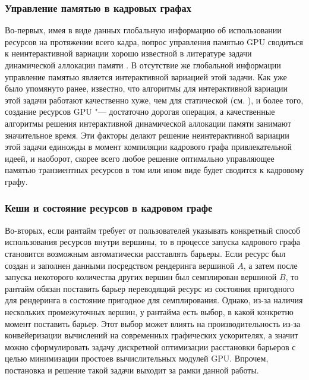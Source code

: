 \subsubsection{Управление памятью в кадровых графах}
Во-первых, имея в виде данных глобальную информацию об использовании ресурсов на протяжении всего кадра, вопрос управления памятью GPU сводиться к неинтерактивной вариации хорошо известной в литературе задачи динамической аллокации памяти \cite[с. 226]{10.5555/574848}.
В отсутствие же глобальной информации управление памятью является интерактивной вариацией этой задачи.
Как уже было упомянуто ранее, известно, что алгоритмы для интерактивной вариации этой задачи работают качественно хуже, чем для статической (см. \cite{robson1971estimate}), и более того, создание ресурсов GPU "--- достаточно дорогая операция, а качественные алгоритмы решения интерактивной динамической аллокации памяти занимают значительное время.
Эти факторы делают решение неинтерактивной вариации этой задачи единожды в момент компиляции кадрового графа привлекательной идеей, и наоборот, скорее всего любое решение оптимально управляющее памятью транзиентных ресурсов в том или ином виде будет сводится к кадровому графу.

\subsubsection{Кеши и состояние ресурсов в кадровом графе}
Во-вторых, если рантайм требует от пользователей указывать конкретный способ использования ресурсов внутри вершины, то в процессе запуска кадрового графа становится возможным автоматически расставлять барьеры.
Если ресурс был создан и заполнен данными посредством рендеринга вершиной $A$, а затем после запуска некоторого количества других вершин был семплирован вершиной $B$, то рантайм обязан поставить барьер переводящий ресурс из состояния пригодного для рендеринга в состояние пригодное для семплирования.
Однако, из-за наличия нескольких промежуточных вершин, у рантайма есть выбор, в какой конкретно момент поставить барьер.
Этот выбор может влиять на производительность из-за конвейеризации вычислений на современных графических ускорителях, а значит можно сформулировать задачу дискретной оптимизации расстановки барьеров с целью минимизации простоев вычислительных модулей GPU.
Впрочем, постановка и решение такой задачи выходит за рамки данной работы.

